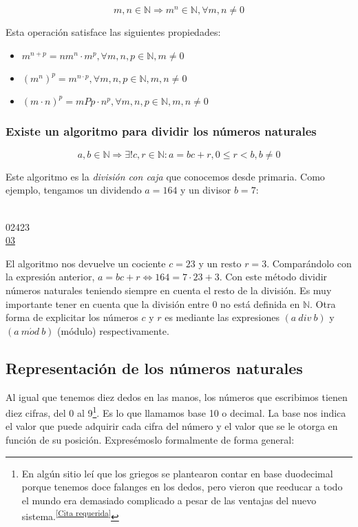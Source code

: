 \[m,n \in\mathbb{N} \Rightarrow m^n \in\mathbb{N}, \forall m,n \neq 0\]

Esta operación satisface las siguientes propiedades:

\begin{itemize}
	\item $m^{n+p} = nm^n \cdot m^p, \forall m,n,p \in\mathbb{N}, m \neq 0$
	\item ${(m^n)}^p = m^{n \cdot p}, \forall m,n,p \in\mathbb{N}, m,n \neq 0$
	\item ${(m \cdot n)}^p = mP p \cdot n^p, \forall m,n,p \in\mathbb{N}, m,n \neq 0$
\end{itemize}

\subsubsection{Existe un algoritmo para dividir los números naturales}

\[a,b \in\mathbb{N} \Rightarrow \exists! c,r \in\mathbb{N} : a = bc + r, 0 \leq r < b, b \neq 0\]

Este algoritmo es la \textit{división con caja} que conocemos desde primaria.
Como ejemplo, tengamos un dividendo $a=164$ y un divisor $b=7$:

\setlength{\parindent}{8cm}
\parbox{10cm}{%
	 \\
	024\hspace{1.05ex}23 \\
	\hspace*{1.1ex}\underline{03} \\
}
\setlength{\parindent}{15pt}

El algoritmo nos devuelve un cociente $c=23$ y un resto $r=3$.
Comparándolo con la expresión anterior, $a = bc + r \Leftrightarrow 164 = 7 \cdot 23 + 3$.
Con este método dividir números naturales teniendo siempre en cuenta el resto de la división.
Es muy importante tener en cuenta que la división entre 0 no está definida en $\mathbb{N}$. Otra forma de explicitar los números $c$ y $r$ es mediante las expresiones $(a\ div\ b)$ y $(a\ m\acute{o}d\ b)$ (módulo) respectivamente.

\subsection{Representación de los números naturales}

Al igual que tenemos diez dedos en las manos, los números que escribimos tienen diez cifras, del 0 al 9\footnote{%
	En algún sitio leí que los griegos se plantearon contar en base duodecimal porque tenemos doce falanges en los dedos, pero vieron que reeducar a todo el mundo era demasiado complicado a pesar de las ventajas del nuevo sistema.\textsuperscript{[\href{https://en.wikipedia.org/wiki/Wikipedia:Citation_needed}{Cita requerida}]}
}.
Es lo que llamamos base 10 o decimal.
La base nos indica el valor que puede adquirir cada cifra del número y el valor que se le otorga en función de su posición.
Expresémoslo formalmente de forma general:

